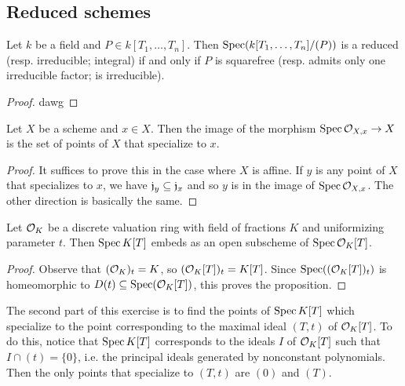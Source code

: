 \subsection{Reduced schemes}
\begin{exer}
	Let $k$ be a field and $P \in k[T_1,\ldots,T_n]$. Then
	$\operatorname{Spec}(k[T_1,\ldots,T_n]/(P))$ is a reduced (resp. irreducible;
	integral) if and only if $P$ is squarefree (resp. admits only one
	irreducible factor; is irreducible).
\end{exer}
\begin{proof}
	dawg
\end{proof}

\begin{exer}
	Let $X$ be a scheme and $x \in X$. Then the image of the morphism
	$\operatorname{Spec} \mathcal{O}_{X,x} \to X$ is the set of points of $X$ that specialize to
	$x$.
\end{exer}
\begin{proof}
	It suffices to prove this in the case where $X$ is affine. If $y$ is
	any point of $X$ that specializes to $x$, we have $\mathfrak{j}_y \subseteq
	\mathfrak{j}_x$ and so $y$ is in the image of $\operatorname{Spec} \mathcal{O}_{X,x}$. The other
	direction is basically the same.
\end{proof}

\begin{exer}
	Let $\mathcal{O}_K$ be a discrete valuation ring with field of fractions $K$
	and uniformizing parameter $t$. Then $\operatorname{Spec} K[T]$ embeds as an open 
	subscheme of $\operatorname{Spec} \mathcal{O}_K[T]$.
\end{exer}
\begin{proof}
	Observe that $(\mathcal{O}_K)_t = K$, so $(\mathcal{O}_K[T])_t = K[T]$. Since
	$\operatorname{Spec}((\mathcal{O}_K[T])_t)$ is homeomorphic to $D(t) \subseteq
	\operatorname{Spec}(\mathcal{O}_K[T])$, this proves the proposition.
\end{proof}

The second part of this exercise is to find the points of $\operatorname{Spec} K[T]$ which
specialize to the point corresponding to the maximal ideal $(T,t)$ of
$\mathcal{O}_K[T]$. To do this, notice that $\operatorname{Spec} K[T]$ corresponds to the ideals $I$
of $\mathcal{O}_K[T]$ such that $I \cap (t) = \{0\}$, i.e. the principal ideals
generated by nonconstant polynomials. Then the only points that specialize to
$(T,t)$ are $(0)$ and $(T)$.

